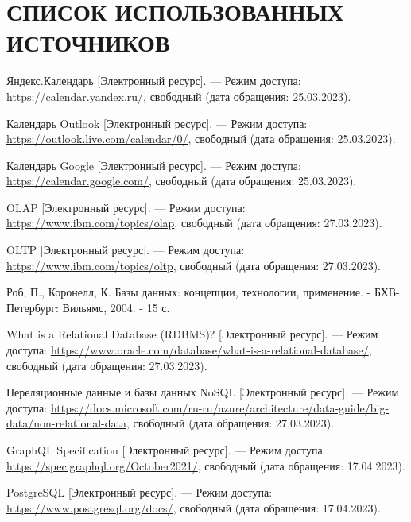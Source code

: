 \section*{СПИСОК ИСПОЛЬЗОВАННЫХ ИСТОЧНИКОВ}
\begingroup
\renewcommand{\section}[2]{}
\begin{thebibliography}{}
	
	Яндекс.Календарь [Электронный ресурс]. --- Режим доступа: \url{https://calendar.yandex.ru/}, свободный (дата обращения: 25.03.2023).
	
	Календарь Outlook [Электронный ресурс]. --- Режим доступа: \url{https://outlook.live.com/calendar/0/}, свободный (дата обращения: 25.03.2023).
	
	Календарь Google [Электронный ресурс]. --- Режим доступа: \url{https://calendar.google.com/}, свободный (дата обращения: 25.03.2023).
	
	OLAP [Электронный ресурс]. --- Режим доступа: \url{https://www.ibm.com/topics/olap}, свободный (дата обращения: 27.03.2023).

	OLTP [Электронный ресурс]. --- Режим доступа: \url{https://www.ibm.com/topics/oltp}, свободный (дата обращения: 27.03.2023).
    
    Роб, П., Коронелл, К. Базы данных: концепции, технологии, применение. - БХВ-Петербург: Вильямс, 2004. - 15 с.
    
    What is a Relational Database (RDBMS)? [Электронный ресурс]. --- Режим доступа: \url{https://www.oracle.com/database/what-is-a-relational-database/}, свободный (дата обращения: 27.03.2023).

    Нереляционные данные и базы данных NoSQL [Электронный ресурс]. --- Режим доступа: \url{https://docs.microsoft.com/ru-ru/azure/architecture/data-guide/big-data/non-relational-data}, свободный (дата обращения: 27.03.2023).
    
    GraphQL Specification [Электронный ресурс]. --- Режим доступа: \url{https://spec.graphql.org/October2021/}, свободный (дата обращения: 17.04.2023).
    
    PostgreSQL [Электронный ресурс]. --- Режим доступа: \url{https://www.postgresql.org/docs/}, свободный (дата обращения: 17.04.2023).
    

\end{thebibliography}
